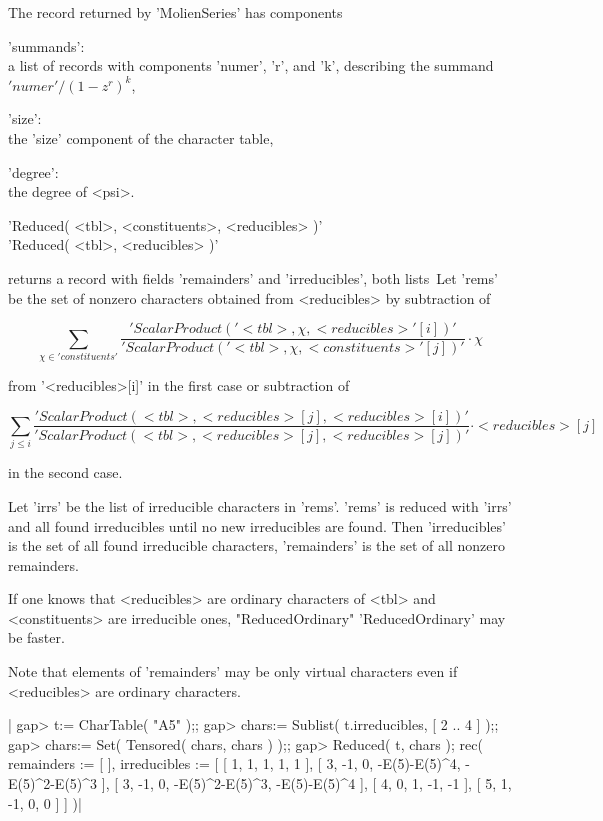 The record returned by 'MolienSeries' has components

'summands': \\ a list of records with components 'numer', 'r', and 'k',
               describing the summand $'numer' / (1-z^r)^k$,

'size':     \\ the 'size' component of the character table,

'degree':   \\ the degree of <psi>.

%

'Reduced( <tbl>, <constituents>, <reducibles> )'\\
'Reduced( <tbl>, <reducibles> )'

returns    a record  with  fields 'remainders'   and 'irreducibles', both
lists\:\ Let   'rems' be  the  set of  nonzero  characters obtained  from
<reducibles> by subtraction of

\[ \sum_{\chi\in 'constituents'}
   \frac{'ScalarProduct(' <tbl>, \chi, <reducibles>'[i] )'}
        {'ScalarProduct(' <tbl>, \chi, <constituents>'[j] )'}
   \cdot \chi \]

from '<reducibles>[i]' in the first case or subtraction of

\[ \sum_{j \leq i}
   \frac{'ScalarProduct( <tbl>, <reducibles>[j], <reducibles>[i] )'}
        {'ScalarProduct( <tbl>, <reducibles>[j], <reducibles>[j] )'}
   \cdot <reducibles>[j] \]

in the second case.

Let  'irrs' be the list of  irreducible characters in  'rems'.  'rems' is
reduced with 'irrs' and all found  irreducibles until no new irreducibles
are found.  Then  'irreducibles' is  the  set of  all found   irreducible
characters, 'remainders' is the set of all nonzero remainders.

If one  knows that <reducibles>    are ordinary characters of <tbl>   and
<constituents> are irreducible ones, "ReducedOrdinary"  'ReducedOrdinary'
may be faster.

Note that elements of 'remainders' may be only virtual characters even if
<reducibles> are ordinary characters.

|    gap> t:= CharTable( "A5" );;
    gap> chars:= Sublist( t.irreducibles, [ 2 .. 4 ] );;
    gap> chars:= Set( Tensored( chars, chars ) );;
    gap> Reduced( t, chars );
    rec(
      remainders := [  ],
      irreducibles :=
       [ [ 1, 1, 1, 1, 1 ], [ 3, -1, 0, -E(5)-E(5)^4, -E(5)^2-E(5)^3 ],
          [ 3, -1, 0, -E(5)^2-E(5)^3, -E(5)-E(5)^4 ], [ 4, 0, 1, -1, -1 ],
          [ 5, 1, -1, 0, 0 ] ] )|

